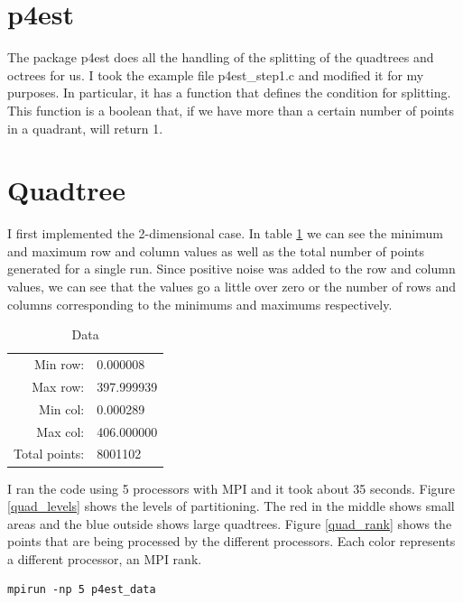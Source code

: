 \documentclass[12pt,letterpaper]{article}
\begin{document}
\section{p4est}

The package p4est does all the handling of the splitting of the quadtrees and octrees for us. I took the example file p4est\_step1.c and modified it for my purposes. In particular, it has a function that defines the condition for splitting. This function is a boolean that, if we have more than a certain number of points in a quadrant, will return 1.

\section{Quadtree}

I first implemented the 2-dimensional case. In table \ref{data} we can see the minimum and maximum row and column values as well as the total number of points generated for a single run. Since positive noise was added to the row and column values, we can see that the values go a little over zero or the number of rows and columns corresponding to the minimums and maximums respectively.

\begin{table}
\centering
\caption{Data}
\label{data}
\begin{tabular}{rl}
Min row:& 0.000008\\
Max row:& 397.999939\\
Min col:& 0.000289\\
Max col:& 406.000000\\
Total points: & 8001102
\end{tabular}
\end{table}

I ran the code using 5 processors with MPI and it took about 35 seconds. Figure \ref{quad_levels} shows the levels of partitioning. The red in the middle shows small areas and the blue outside shows large quadtrees. Figure \ref{quad_rank} shows the points that are being processed by the different processors. Each color represents a different processor, an MPI rank.

\begin{verbatim}
mpirun -np 5 p4est_data
\end{verbatim}
\end{document}
